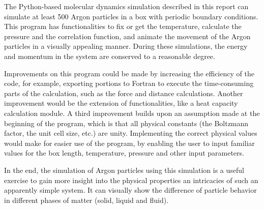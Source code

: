 \documentclass[a4paper,twoside,12pt]{article}
\begin{document}
\noindent The Python-based molecular dynamics simulation described in this report can simulate at least 500 Argon particles in a box with periodic boundary conditions. This program has functionalities to fix or get the temperature, calculate the pressure and the correlation function, and animate the movement of the Argon particles in a visually appealing manner. During these simulations, the energy and momentum in the system are conserved to a reasonable degree.
\vspace{5mm}

\noindent Improvements on this program could be made by increasing the efficiency of the code, for example, exporting portions to Fortran to execute the time-consuming parts of the calculation, such as the force and distance calculations. Another improvement would be the extension of functionalities, like a heat capacity calculation module. A third improvement builds upon an assumption made at the beginning of the program, which is that all physical constants (the Boltzmann factor, the unit cell size, etc.) are unity. Implementing the correct physical values would make for easier use of the program, by enabling the user to input familiar values for the box length, temperature, pressure and other input parameters.
\vspace{5mm}

\noindent In the end, the simulation of Argon particles using this simulation is a useful exercise to gain more insight into the physical properties an intricacies of such an apparently simple system. It can visually show the difference of particle behavior in different phases of matter (solid, liquid and fluid).
\end{document}
